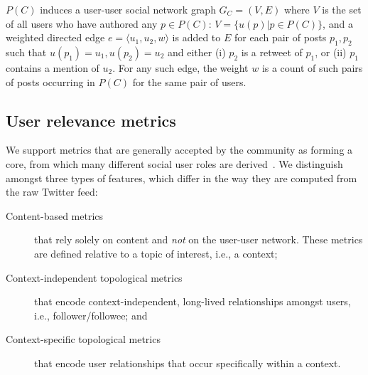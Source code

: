 $P(C)$ induces a user-user social network graph $G_C = (V,E)$ where $V$ is the set of all users who have authored any $p \in P(C)$: 
$V = \{ u(p) | p \in P(C) \}$, and a weighted directed edge $e = \langle u_1, u_2, w \rangle$ is added to $E$ for each pair of posts $p_1, p_2$ such that $u(p_1) = u_1, u(p_2) = u_2$ and 
either (i) $p_2$ is a retweet of $p_1$, or (ii) $p_1$ contains a mention of $u_2$.
For any such edge, the weight $w$ is a count of such pairs of posts occurring in $P(C)$ for the same pair of users.

\subsection{User relevance metrics}  \label{sec:metrics}

We support metrics that are generally accepted by the community as forming a core, from which many different social user roles are derived~\cite{RIQUELME2016949}. 
We distinguish amongst three types of features, which differ in the way they are computed from the raw Twitter feed:
\begin{description}
	\item[Content-based metrics] that rely solely on content and \textit{not} on the user-user network. These metrics are defined relative to a topic of interest, i.e., a context;
	\item[Context-independent topological metrics] that encode context-independent, long-lived relationships amongst users, i.e., follower/followee; and 
	\item[Context-specific topological metrics] that encode user relationships that occur specifically within a context.
\end{description}

